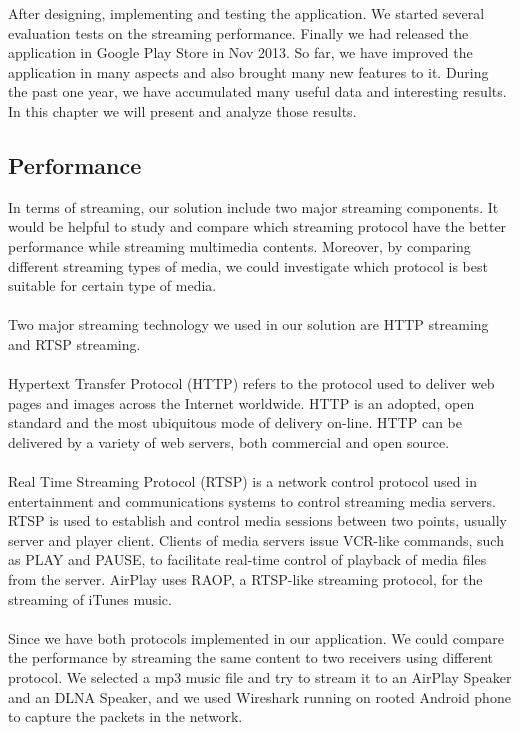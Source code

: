 
After designing, implementing and testing the application. We started several evaluation tests on the streaming performance. Finally we had released the application in Google Play Store in Nov 2013. So far, we have improved the application in many aspects and also brought many new features to it. During the past one year, we have accumulated many useful data and interesting results. In this chapter we will present and analyze those results.

\subsection{Performance}
In terms of streaming, our solution include two major streaming components. It would be helpful to study and compare which streaming protocol have the better performance while streaming multimedia contents. Moreover, by comparing different streaming types of media, we could investigate which protocol is best suitable for certain type of media. \\
\\Two major streaming technology we used in our solution are HTTP streaming and RTSP streaming.\\
\\
Hypertext Transfer Protocol (HTTP) refers to the protocol used to deliver web pages and images across the Internet worldwide. HTTP is an adopted, open standard and the most ubiquitous mode of delivery on-line. HTTP can be delivered by a variety of web servers, both commercial and open source.\\
\\
Real Time Streaming Protocol (RTSP) is a network control protocol used in entertainment and communications systems to control streaming media servers. RTSP is used to establish and control media sessions between two points, usually server and player client. Clients of media servers issue VCR-like commands, such as PLAY and PAUSE, to facilitate real-time control of playback of media files from the server. AirPlay uses RAOP, a RTSP-like streaming protocol, for the streaming of iTunes music. \\
\\
Since we have both protocols implemented in our application. We could compare the performance by streaming the same content to two receivers using different protocol. We selected a mp3 music file and try to stream it to an AirPlay Speaker and an DLNA Speaker, and we used Wireshark running on rooted Android phone to capture the packets in the network.\\
